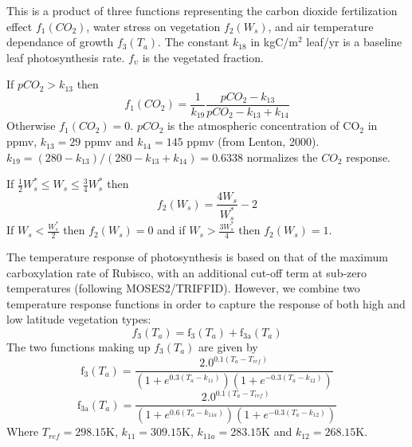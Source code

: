 \documentclass[10pt,a4paper]{report}
\begin{document}
This is a product of three functions representing the carbon dioxide
fertilization effect $f_1(CO_2)$, water stress on vegetation
$f_2(W_s)$, and air temperature dependance of growth $f_3(T_a)$. The
constant $k_{18}$ in kgC/m$^2$ leaf/yr is a baseline leaf
photosynthesis rate. $f_{\upsilon}$ is the vegetated fraction.

If $pCO_2>k_{13}$ then
\begin{displaymath}
f_1(CO_2)=\frac{1}{k_{19}}\frac{pCO_2-k_{13}}{pCO_2-k_{13}+k_{14}}
\end{displaymath}
Otherwise $f_1(CO_2)=0$. $pCO_2$ is the atmospheric concentration of
CO$_2$ in ppmv, $k_{13}=29$ ppmv and $k_{14}=145$ ppmv (from Lenton,
2000). $k_{19}=(280-k_{13})/(280-k_{13}+k_{14})=0.6338$ normalizes
the $CO_{2}$ response.


If $\frac{1}{2}W_s^* \leq W_s \leq \frac{3}{4} W_s^*$ then
\begin{displaymath}
f_2(W_s)=\frac{4 W_s}{W_s^*}-2
\end{displaymath}
If $W_s < \frac{W_s^*}{2}$ then $f_2(W_s)=0$ and if $W_s > \frac{3
W_s^*}{4} $ then $f_2(W_s)=1$.

The temperature response of photosynthesis is based on that of the
maximum carboxylation rate of Rubisco, with an additional cut-off
term at sub-zero temperatures (following MOSES2/TRIFFID). However,
we combine two temperature response functions in order to capture
the response of both high and low latitude vegetation types:
\begin{displaymath}
f_3(T_a)=\mathrm{f_3}(T_a)+\mathrm{f_{3a}}(T_a)
\end{displaymath}
The two functions making up $f_3(T_a)$ are given by
\begin{displaymath}
\mathrm{f_3}(T_a)=\frac{2.0^{0.1(T_a-T_{ref})}}{(1+e^{0.3(T_a-k_{11})})(1+e^{-0.3(T_a-k_{12})})}
\end{displaymath}
\begin{displaymath}
\mathrm{f_{3a}}(T_a)=\frac{2.0^{0.1(T_a-T_{ref})}}{(1+e^{0.6(T_a-k_{11a})})(1+e^{-0.3(T_a-k_{12})})}
\end{displaymath}
Where $T_{ref}=298.15$K, $k_{11}=309.15$K, $k_{11a}=283.15$K and
$k_{12}=268.15$K.
\end{document}
